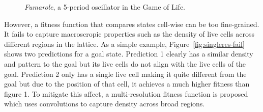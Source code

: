 \begin{figure}[!h]
\centering
            \hfill
            \hfill
            \hfill
            \hfill
            \hfill
            \caption{\textit{Fumarole}, a 5-period oscillator in the Game of Life. \cite{fumarole}}
\label{fig:fumarole}
\end{figure}

However, a fitness function that compares states cell-wise can be too fine-grained. It fails to capture macroscropic properties such as the density of live cells across different regions in the lattice. As a simple example, Figure~\ref{fig:singleres-fail} shows two predictions for a goal state. Prediction 1 clearly has a similar density and pattern to the goal but its live cells do not align with the live cells of the goal. Prediction 2 only has a single live cell making it quite different from the goal but due to the position of that cell, it achieves a much higher fitness than figure 1. To mitigate this affect, a multi-resolution fitness function is proposed which uses convolutions to capture density across broad regions.\\

